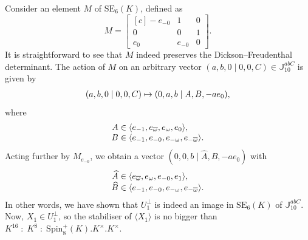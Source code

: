 \documentclass{amsart}
\def\cn{\mathord{{\;\!{:}\;\!}}}
\newcommand{\SE}{\mathrm{SE}}
\newcommand{\Spin}{\mathrm{Spin}}
\newcommand{\J}{\mathbb{J}}
\renewcommand{\bar}{\overline}
\renewcommand{\hat}{\widehat}
\theoremstyle{plain}
\numberwithin{theorem}{section}
\theoremstyle{definition}
\begin{document}
Consider an element $M$ of $\SE_6(K)$, defined as
\begin{equation*}
	M = \begin{bmatrix}[c]
		- e_{-0} & 1 & 0 \\
		0 & 0 & 1 \\
		e_0 & e_{-0} & 0
	\end{bmatrix}.
\end{equation*}
It is straightforward to see that $M$ indeed preserves
the Dickson--Freudenthal determinant. The action of
$M$ on an arbitrary vector $(a,b,0\mid 0,0,C) \in \J_{10}^{abC}$
is given by
\begin{equation*}
	\begin{array}{r@{\;}c@{\;}l}
		(a,b,0\mid 0,0,C) & \mapsto & (0,a,b \mid A, B, -a e_0),\\
	\end{array}
\end{equation*}
where 
\begin{equation*}
	\begin{array}{r@{\;}c@{\;}l}
			A & \in & \langle e_{-1}, e_{\bar{\omega}},
						e_{\omega}, e_0 \rangle, \\
		B & \in & \langle e_{-1}, e_{-0}, e_{-\omega}, 
						e_{-\bar{\omega}} \rangle.	
	\end{array}
\end{equation*}
Acting further by $M_{e_{-0}}$, we obtain a vector
$(0,0,b \mid \hat{A}, \hat{B}, -a e_0)$ with
\begin{equation*}
	\begin{array}{r@{\;}c@{\;}l}
		\hat{A} & \in & \langle e_{\bar{\omega}}, e_{\omega}, e_{-0}, e_1 \rangle, \\
		\hat{B} & \in & \langle e_{-1}, e_{-0}, e_{-\omega}, e_{-\bar{\omega}} \rangle.
	\end{array}
\end{equation*}
In other words, we have shown that $U_1^{\perp}$ is indeed
an image in $\SE_6(K)$ of $\J_{10}^{abC}$. 
Now, $X_1 \in U_1^{\perp}$, so the
stabiliser of $\langle X_1 \rangle$ is no bigger than  
\mbox{$K^{16}\cn K^8 \cn \Spin_8^+(K).K^{\times}.K^{\times}$}.
\end{document}
